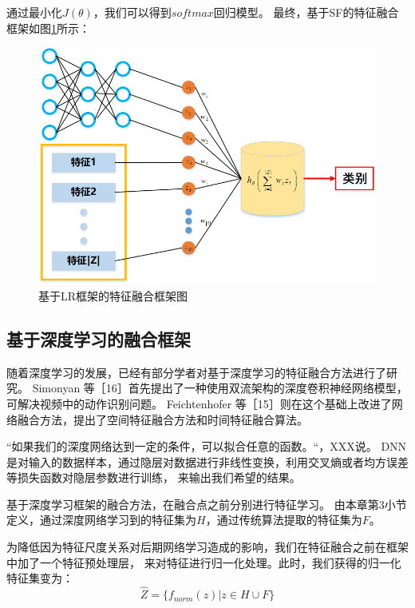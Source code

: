 通过最小化$J(\theta)$，我们可以得到$softmax$回归模型。
最终，基于SF的特征融合框架如图\ref{sec:fig_4_2}所示：\par
\begin{figure}[!h]
	\centering
	\includegraphics[scale=0.7]{figures/chapter_4/fig_4_2}
	\caption{基于LR框架的特征融合框架图}\label{sec:fig_4_2}
\end{figure}


\subsection{基于深度学习的融合框架}
随着深度学习的发展，已经有部分学者对基于深度学习的特征融合方法进行了研究。
Simonyan 等［16］首先提出了一种使用双流架构的深度卷积神经网络模型，可解决视频中的动作识别问题。
Feichtenhofer 等［15］则在这个基础上改进了网络融合方法，提出了空间特征融合方法和时间特征融合算法。\par

“如果我们的深度网络达到一定的条件，可以拟合任意的函数。“，XXX说。
DNN是对输入的数据样本，通过隐层对数据进行非线性变换，利用交叉熵或者均方误差等损失函数对隐层参数进行训练，
来输出我们希望的结果。\par

基于深度学习框架的融合方法，在融合点之前分别进行特征学习。
由本章第3小节定义，通过深度网络学习到的特征集为$H$，通过传统算法提取的特征集为$F$。\par

为降低因为特征尺度关系对后期网络学习造成的影响，我们在特征融合之前在框架中加了一个特征预处理层，
来对特征进行归一化处理。此时，我们获得的归一化特征集变为：
\begin{equation}
	\label{eqt_4_23}
	\hat{Z} =\{ f_{norm}(z) | z \in H \cup F \}
\end{equation}

